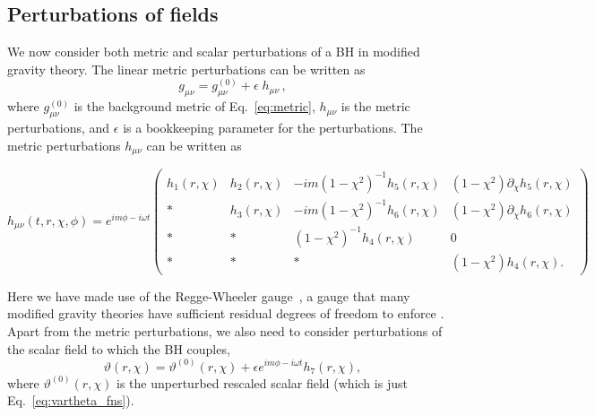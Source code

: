 \documentclass[aps,prx,amsmath,floats,floatfix,twocolumn,
  superscriptaddress,nofootinbib,showpacs]{revtex4-1}
\newcommand{\be}{\begin{equation}}
\newcommand{\ee}{\end{equation}}
\begin{document}
\subsection{Perturbations of fields}
\label{sec:metpert}

We now consider both metric and scalar perturbations of a BH in modified gravity theory. 
The linear metric perturbations can be written as 
\be \label{eq:metpert}
g_{\mu\nu} = g_{\mu\nu}^{(0)} + \epsilon \; h_{\mu\nu} \,,
\ee
where $g_{\mu\nu}^{(0)}$ is the background metric of Eq.~\eqref{eq:metric}, $h_{\mu\nu}$ is the metric perturbations, and $\epsilon$ is a bookkeeping parameter for the perturbations. 
The metric perturbations $h_{\mu\nu}$ can be written as 
\begin{widetext}
\begin{equation}\label{eq:metpert}
h_{\mu\nu} (t,r,\chi,\phi) = e^{im\phi-i\omega t}
\begin{pmatrix}
    h_1(r,\chi) & h_2(r,\chi) & -im(1-\chi^2)^{-1} h_5(r,\chi) &  (1-\chi^2) \partial_\chi h_5(r,\chi) \\
    * & h_3(r,\chi) & -im(1-\chi^2)^{-1} h_6(r,\chi) &  (1-\chi^2) \partial_\chi h_6(r,\chi) \\
	* & * & \left( 1 - \chi^2 \right)^{-1} h_4(r,\chi) & 0  \\
	* & * & * & \left( 1 - \chi^2 \right) h_4(r,\chi).  
\end{pmatrix}
\end{equation}
\end{widetext}
Here we have made use of the Regge-Wheeler gauge~\cite{Regge:PhysRev.108.1063, Berti_02}, a gauge that many modified gravity theories have sufficient residual degrees of freedom to enforce \cite{QNM_dCS_01, QNM_dCS_02, QNM_dCS_03, QNM_dCS_04, QNM_EdGB_01, QNM_EdGB_02, QNM_EdGB_03}.
Apart from the metric perturbations, we also need to consider perturbations of the scalar field to which the BH couples, 
\begin{equation}\label{eq:scalar_pert}
\vartheta(r, \chi) = \vartheta^{(0)}(r, \chi)  + \epsilon e^{im\phi-i\omega t} h_7 (r, \chi), 
\end{equation}
where $\vartheta^{(0)}(r, \chi)$ is the unperturbed rescaled scalar field (which is just Eq.~\eqref{eq:vartheta_fns}). 
\end{document}
